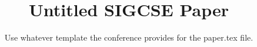 \documentclass[sigconf]{acmart}
\begin{document}
\title{Untitled SIGCSE Paper}


\newcommand{\showurlx}{[redacted]}

\author{
Use whatever template the conference provides for the paper.tex file.
}



\maketitle











{\footnotesize 
}
\end{document}
